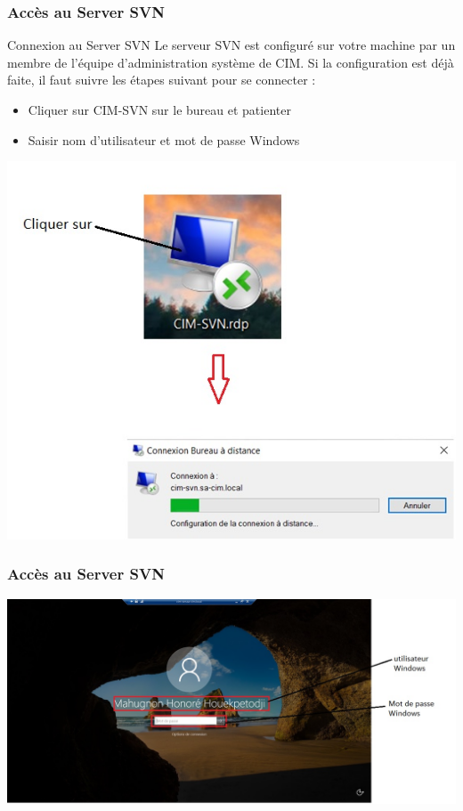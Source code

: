 \documentclass{beamer}
\begin{document}
\begin{frame}
\frametitle{Accès au Server SVN }
\begin{block}{Connexion au Server SVN}
Le serveur SVN est configuré sur votre machine par un membre de l'équipe d'administration système de CIM. Si la configuration est déjà faite, il faut suivre les étapes suivant pour se connecter :
\begin{itemize}
\item Cliquer sur \alert{CIM-SVN} sur le bureau et patienter
\item Saisir nom d'utilisateur et mot de passe Windows
\end{itemize}
\end{block}
\includegraphics[scale=.3]{../images/server.jpg}
\end{frame}

\begin{frame}
\frametitle{Accès au Server SVN }
\includegraphics[scale=.5]{../images/server1.jpg}
\end{frame}
\end{document}

